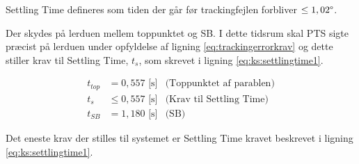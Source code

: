 Settling Time defineres som tiden der går før trackingfejlen forbliver \(\leq 1,02\degree\).

Der skydes på lerduen mellem toppunktet og SB.
I dette tidsrum skal PTS sigte præcist på lerduen under opfyldelse af ligning \ref{eq:trackingerrorkrav} og dette 
stiller krav til Settling Time, \(t_s\), som skrevet i ligning \ref{eq:ks:settlingtime1}.

\begin{align}
  t_{top} &= 0,557\text{ [s]} &\text{(Toppunktet af parablen)}
  \label{eq:ks:toppunktstid}
  \\
  t_{s} & \leq 0,557\text{ [s]} &\text{(Krav til Settling Time)}
  \label{eq:ks:settlingtime1}
  \\
   t_{SB} &= 1,180\text{ [s]} &\text{(SB)}
  \label{eq:ks:sbtid}
\end{align}

Det eneste krav der stilles til systemet er Settling Time kravet beskrevet i ligning \ref{eq:ks:settlingtime1}.



